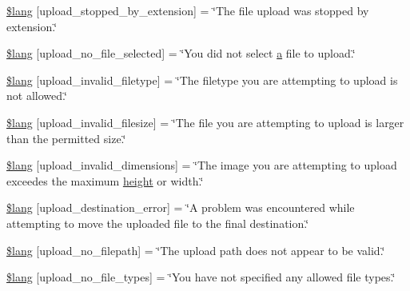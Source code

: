 \begin{DoxyCompactItemize}
\item 
\hyperlink{system_2language_2english_2upload__lang_8php_ae97257deea3dddb33be4bbc6510a464b}{\$lang} \mbox{[}\textquotesingle{}upload\+\_\+stopped\+\_\+by\+\_\+extension\textquotesingle{}\mbox{]} = \char`\"{}The file upload was stopped by extension.\char`\"{}
\item 
\hyperlink{system_2language_2english_2upload__lang_8php_a88d8e8f9b879d1c25e6c089f3d3b5a30}{\$lang} \mbox{[}\textquotesingle{}upload\+\_\+no\+\_\+file\+\_\+selected\textquotesingle{}\mbox{]} = \char`\"{}You did not select \hyperlink{_chart_8min_8js_aef3b685c08bc6c76c8e729bd0e93901d}{a} file to upload.\char`\"{}
\item 
\hyperlink{system_2language_2english_2upload__lang_8php_ac8631aa85ed80396bd78e91a76d5fd38}{\$lang} \mbox{[}\textquotesingle{}upload\+\_\+invalid\+\_\+filetype\textquotesingle{}\mbox{]} = \char`\"{}The filetype you are attempting to upload is not allowed.\char`\"{}
\item 
\hyperlink{system_2language_2english_2upload__lang_8php_a832b3ec1d84b1d48a488cf525954d8f2}{\$lang} \mbox{[}\textquotesingle{}upload\+\_\+invalid\+\_\+filesize\textquotesingle{}\mbox{]} = \char`\"{}The file you are attempting to upload is larger than the permitted size.\char`\"{}
\item 
\hyperlink{system_2language_2english_2upload__lang_8php_a4e796eeccf7df90acffea7884a5bd558}{\$lang} \mbox{[}\textquotesingle{}upload\+\_\+invalid\+\_\+dimensions\textquotesingle{}\mbox{]} = \char`\"{}The image you are attempting to upload exceedes the maximum \hyperlink{jquery-ui_8min_8js_a7ec7f4e8243c6c20295ecc9a90225d43}{height} or width.\char`\"{}
\item 
\hyperlink{system_2language_2english_2upload__lang_8php_a31be70c748b9bfc43dd7468e1fa64c42}{\$lang} \mbox{[}\textquotesingle{}upload\+\_\+destination\+\_\+error\textquotesingle{}\mbox{]} = \char`\"{}A problem was encountered while attempting to move the uploaded file to the final destination.\char`\"{}
\item 
\hyperlink{system_2language_2english_2upload__lang_8php_a3c17908c53072c6a5ef593760aaaa704}{\$lang} \mbox{[}\textquotesingle{}upload\+\_\+no\+\_\+filepath\textquotesingle{}\mbox{]} = \char`\"{}The upload path does not appear to be valid.\char`\"{}
\item 
\hyperlink{system_2language_2english_2upload__lang_8php_ab188c98e583c81905dedaad54ad452bb}{\$lang} \mbox{[}\textquotesingle{}upload\+\_\+no\+\_\+file\+\_\+types\textquotesingle{}\mbox{]} = \char`\"{}You have not specified any allowed file types.\char`\"{}

\end{DoxyCompactItemize}
